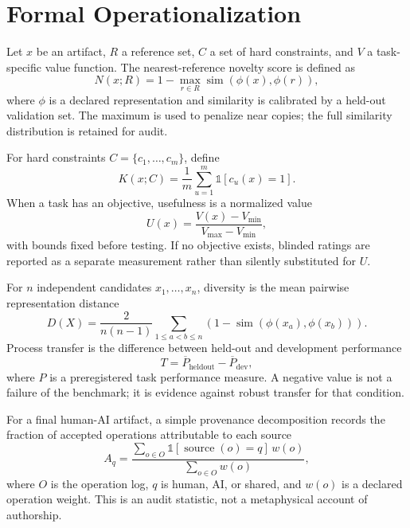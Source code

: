 \documentclass[conference]{IEEEtran}
\begin{document}
\section{Formal Operationalization}
\label{sec:formal}

Let $x$ be an artifact, $R$ a reference set, $C$ a set of hard constraints, and $V$
a task-specific value function. The nearest-reference novelty score is defined as
\begin{equation}
N(x;R)=1-\max_{r\in R}\operatorname{sim}(\phi(x),\phi(r)),
\label{eq:novelty}
\end{equation}
where $\phi$ is a declared representation and similarity is calibrated by a held-out
validation set. The maximum is used to penalize near copies; the full similarity
distribution is retained for audit.

For hard constraints $C=\{c_1,\ldots,c_m\}$, define
\begin{equation}
K(x;C)=\frac{1}{m}\sum_{u=1}^{m}{\mathbb{1}}[c_u(x)=1].
\label{eq:constraints}
\end{equation}
When a task has an objective, usefulness is a normalized value
\begin{equation}
U(x)=\frac{V(x)-V_{\min}}{V_{\max}-V_{\min}},
\label{eq:utility}
\end{equation}
with bounds fixed before testing. If no objective exists, blinded ratings are reported
as a separate measurement rather than silently substituted for $U$.

For $n$ independent candidates $x_1,\ldots,x_n$, diversity is the mean pairwise
representation distance
\begin{equation}
D(X)=\frac{2}{n(n-1)}\sum_{1\leq a<b\leq n}\left(1-\operatorname{sim}(\phi(x_a),\phi(x_b))\right).
\label{eq:diversity}
\end{equation}
Process transfer is the difference between held-out and development performance
\begin{equation}
T=\overline{P}_{\mathrm{heldout}}-\overline{P}_{\mathrm{dev}},
\label{eq:transfer}
\end{equation}
where $P$ is a preregistered task performance measure. A negative value is not a
failure of the benchmark; it is evidence against robust transfer for that condition.

For a final human-AI artifact, a simple provenance decomposition records the fraction
of accepted operations attributable to each source
\begin{equation}
A_q=\frac{\sum_{o\in O}{\mathbb{1}[\operatorname{source}(o)=q]\,w(o)}}{\sum_{o\in O}w(o)},
\label{eq:attribution}
\end{equation}
where $O$ is the operation log, $q$ is human, AI, or shared, and $w(o)$ is a declared
operation weight. This is an audit statistic, not a metaphysical account of authorship.
\end{document}
